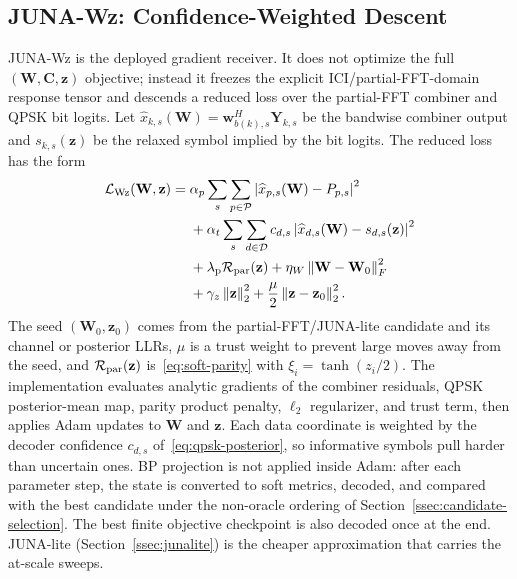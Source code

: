 \documentclass[journal]{IEEEtran}
\newcommand{\Ht}{^{H}}
\newcommand{\norm}[1]{\left\lVert #1 \right\rVert}
\newcommand{\abs}[1]{\left\lvert #1 \right\rvert}
\newcommand{\junalite}{JUNA-lite}
\newcommand{\junawz}{JUNA-Wz}
\begin{document}
\subsection{\texorpdfstring{\junawz{}}{JUNA-Wz}: Confidence-Weighted
Descent}\label{ssec:gradient-juna}
\junawz{} is the deployed gradient receiver. It does not optimize the full
$(\mathbf W,\mathbf C,\mathbf z)$ objective; instead it freezes the explicit
ICI/partial-FFT-domain response tensor and descends a reduced loss over the partial-FFT
combiner and QPSK bit logits. Let
$\widehat x_{k,s}(\mathbf W)=\mathbf w_{b(k),s}\Ht\mathbf Y_{k,s}$ be the
bandwise combiner output and $s_{k,s}(\mathbf z)$ be the relaxed symbol implied
by the bit logits. The reduced loss has the form
\begin{equation}
  \begin{aligned}
  \mathcal L_{\rm Wz}(\mathbf W,\mathbf z)
  ={}&
  \alpha_p\sum_s\sum_{p\in\mathcal P}
       \abs{\widehat x_{p,s}(\mathbf W)-P_{p,s}}^2\\
  &+\alpha_t\sum_s\sum_{d\in\mathcal D}
       c_{d,s}\abs{\widehat x_{d,s}(\mathbf W)-s_{d,s}(\mathbf z)}^2\\
  &+\lambda_{\rm p}\mathcal R_{\rm par}(\mathbf z)
   +\eta_W\norm{\mathbf W-\mathbf W_0}_F^2\\
  &+\gamma_z\norm{\mathbf z}_2^2
   +\frac{\mu}{2}\norm{\mathbf z-\mathbf z_0}_2^2 .
  \end{aligned}
  \label{eq:gradient-rescue}
\end{equation}
The seed $(\mathbf W_0,\mathbf z_0)$ comes from the partial-FFT/\junalite{}
candidate and its channel or posterior LLRs, $\mu$ is a trust weight to prevent
large moves away from the seed, and
$\mathcal R_{\rm par}(\mathbf z)$ is~\eqref{eq:soft-parity} with
$\xi_i=\tanh(z_i/2)$. The implementation evaluates analytic gradients of the
combiner residuals, QPSK posterior-mean map, parity product penalty, $\ell_2$
regularizer, and trust term, then applies Adam updates to $\mathbf W$ and
$\mathbf z$. Each data coordinate is weighted by the decoder confidence
$c_{d,s}$ of~\eqref{eq:qpsk-posterior}, so informative symbols pull harder than
uncertain ones. BP projection is not applied inside Adam: after each parameter
step, the state is converted to soft metrics, decoded, and compared with the
best candidate under the non-oracle ordering of
Section~\ref{ssec:candidate-selection}. The best finite objective checkpoint is
also decoded once at the end. \junalite{}
(Section~\ref{ssec:junalite}) is the cheaper approximation that carries the
at-scale sweeps.
\end{document}
